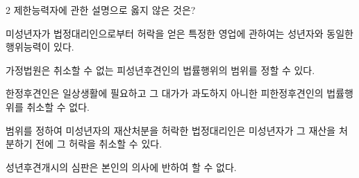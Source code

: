 \begin{question}{2}
제한능력자에 관한 설명으로 옳지 않은 것은?
\begin{choices}
  \item 미성년자가 법정대리인으로부터 허락을 얻은 특정한 영업에 관하여는 성년자와 동일한 행위능력이 있다.
  \item 가정법원은 취소할 수 없는 피성년후견인의 법률행위의 범위를 정할 수 있다.
  \item 한정후견인은 일상생활에 필요하고 그 대가가 과도하지 아니한 피한정후견인의 법률행위를 취소할 수 없다.
  \item 범위를 정하여 미성년자의 재산처분을 허락한 법정대리인은 미성년자가 그 재산을 처분하기 전에 그 허락을 취소할 수 있다.
  \item 성년후견개시의 심판은 본인의 의사에 반하여 할 수 없다.
\end{choices}
\end{question}
